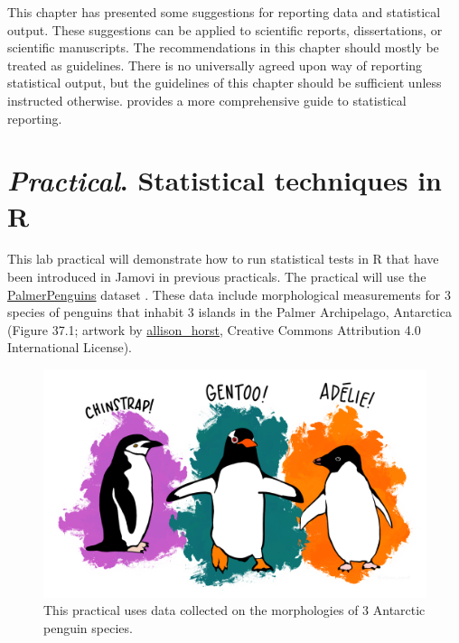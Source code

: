 \documentclass[
]{scrbook}
\begin{document}
This chapter has presented some suggestions for reporting data and statistical output.
These suggestions can be applied to scientific reports, dissertations, or scientific manuscripts.
The recommendations in this chapter should mostly be treated as guidelines.
There is no universally agreed upon way of reporting statistical output, but the guidelines of this chapter should be sufficient unless instructed otherwise.
\citet{Lang1997} provides a more comprehensive guide to statistical reporting.

\hypertarget{Chapter_37}{%
\chapter{\texorpdfstring{\emph{Practical}. Statistical techniques in R}{Practical. Statistical techniques in R}}\label{Chapter_37}}

This lab practical will demonstrate how to run statistical tests in R that have been introduced in Jamovi in previous practicals.
The practical will use the \href{https://allisonhorst.github.io/palmerpenguins/articles/intro.html\#package-citation-1}{PalmerPenguins} dataset \citep{GormanEtAl2014, HorstEtAl2020}.
These data include morphological measurements for 3 species of penguins that inhabit 3 islands in the Palmer Archipelago, Antarctica (Figure 37.1; artwork by \href{https://allisonhorst.com/}{allison\_horst}, Creative Commons Attribution 4.0 International License).

\begin{figure}
\includegraphics[width=1\linewidth]{img/penguins} \caption{This practical uses data collected on the morphologies of 3 Antarctic penguin species.}\label{fig:unnamed-chunk-217}
\end{figure}
\end{document}
